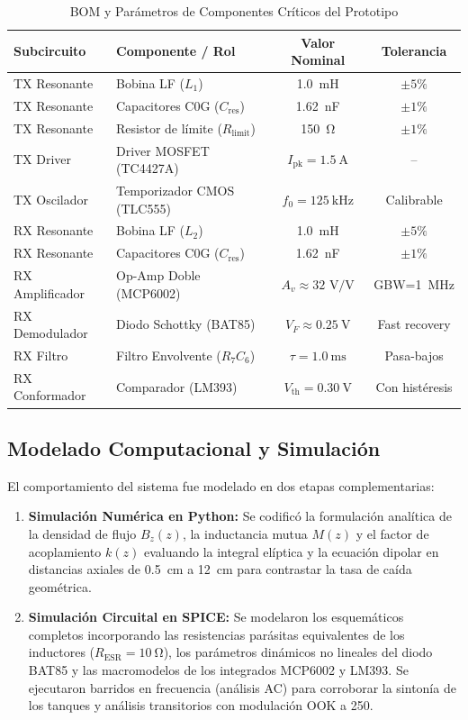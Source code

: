 \begin{table}[htbp]
\caption{BOM y Parámetros de Componentes Críticos del Prototipo}
\label{tab:componentes}
\centering
\begin{tabular}{llcc}
\toprule
\textbf{Subcircuito} & \textbf{Componente / Rol} & \textbf{Valor Nominal} & \textbf{Tolerancia} \\
\midrule
TX Resonante & Bobina LF ($L_1$) & \SI{1.0}{\milli\henry} & $\pm 5\%$ \\
TX Resonante & Capacitores C0G ($C_{\text{res}}$) & \SI{1.62}{\nano\farad} & $\pm 1\%$ \\
TX Resonante & Resistor de límite ($R_{\text{limit}}$) & \SI{150}{\ohm} & $\pm 1\%$ \\
TX Driver & Driver MOSFET (TC4427A) & $I_{\text{pk}} = \SI{1.5}{\ampere}$ & -- \\
TX Oscilador & Temporizador CMOS (TLC555) & $f_0 = \SI{125}{\kilo\hertz}$ & Calibrable \\
RX Resonante & Bobina LF ($L_2$) & \SI{1.0}{\milli\henry} & $\pm 5\%$ \\
RX Resonante & Capacitores C0G ($C_{\text{res}}$) & \SI{1.62}{\nano\farad} & $\pm 1\%$ \\
RX Amplificador & Op-Amp Doble (MCP6002) & $A_v \approx 32\text{ V/V}$ & GBW=\SI{1}{\mega\hertz} \\
RX Demodulador & Diodo Schottky (BAT85) & $V_F \approx \SI{0.25}{\volt}$ & Fast recovery \\
RX Filtro & Filtro Envolvente ($R_7 C_6$) & $\tau = \SI{1.0}{\milli\second}$ & Pasa-bajos \\
RX Conformador & Comparador (LM393) & $V_{\text{th}} = \SI{0.30}{\volt}$ & Con histéresis \\
\bottomrule
\end{tabular}
\end{table}

\subsection{Modelado Computacional y Simulación}
\label{subsec:simulacion}

El comportamiento del sistema fue modelado en dos etapas complementarias:
\begin{enumerate}
    \item \textbf{Simulación Numérica en Python:} Se codificó la formulación analítica de la densidad de flujo $B_z(z)$, la inductancia mutua $M(z)$ y el factor de acoplamiento $k(z)$ evaluando la integral elíptica y la ecuación dipolar en distancias axiales de \SI{0.5}{\centi\meter} a \SI{12}{\centi\meter} para contrastar la tasa de caída geométrica.
    \item \textbf{Simulación Circuital en SPICE:} Se modelaron los esquemáticos completos incorporando las resistencias parásitas equivalentes de los inductores ($R_{\text{ESR}} = \SI{10}{\ohm}$), los parámetros dinámicos no lineales del diodo BAT85 y las macromodelos de los integrados MCP6002 y LM393. Se ejecutaron barridos en frecuencia (análisis AC) para corroborar la sintonía de los tanques y análisis transitorios con modulación OOK a \SI{250}{}.
\end{enumerate}

